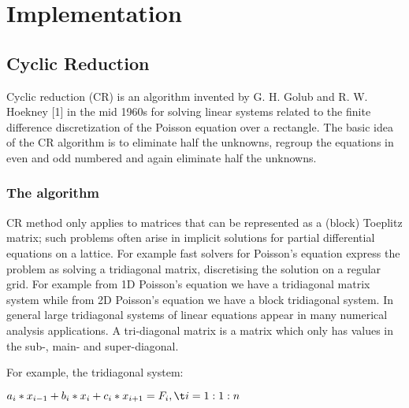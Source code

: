 \chapter{Implementation}

\section{Cyclic Reduction}


Cyclic reduction (CR) is an algorithm invented by G. H. Golub and R. W. Hoekney [1] in the mid 1960s for solving linear systems related to the finite difference discretization of the Poisson equation over a rectangle. 
The basic idea of the CR algorithm is to eliminate half the unknowns, regroup the equations in even and odd numbered and again eliminate half the unknowns.


\subsection{The algorithm}

CR method only applies to matrices that can be represented as a (block) Toeplitz matrix; such problems often arise in implicit solutions for partial differential equations on a lattice. For example fast solvers for Poisson's equation express the problem as solving a tridiagonal matrix, discretising the solution on a regular grid. For example from 1D Poisson’s equation we have a tridiagonal matrix system while from 2D Poisson’s equation we have a block tridiagonal system.
In general large tridiagonal systems of linear equations appear in many numerical analysis applications. A tri-diagonal matrix is a matrix which only has values in the sub-, main- and super-diagonal.

For example, the tridiagonal system:

$a_i*x_{i-1} + b_i*x_i+c_i*x_{i+1} = F_{i} ,\t  i=1:1:n$